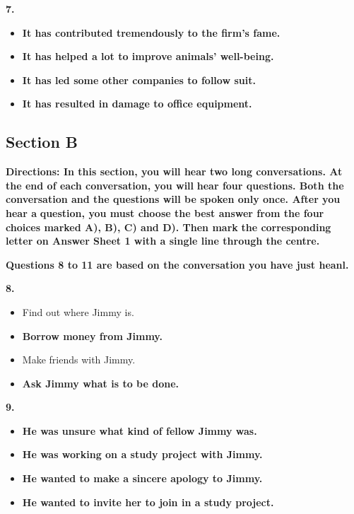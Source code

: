 \documentclass[UTF8,11pt]{ctexart}
\begin{document}
\textbf{7.}


\begin{itemize}[leftmargin=2em,itemsep=.2em,topsep=.4em]\item[A.] \textbf{It has contributed tremendously to the firm's fame.}
\item[B.] \textbf{It has helped a lot to improve animals' well-being.}
\item[C.] \textbf{It has led some other companies to follow suit.}
\item[D.] \textbf{It has resulted in damage to office equipment.}
\end{itemize}

\subsection*{\textbf{Section B}}


\textbf{Directions: In this section, you will hear two long conversations. At the end of each conversation, you will} \textbf{hear four questions. Both the conversation and the questions will be spoken only once. After you hear a} \textbf{question, you must choose the best answer from the four choices marked A), B), C) and D). Then mark} \textbf{the corresponding letter on Answer Sheet 1 with a single line through the centre.}


\textbf{Questions 8 to 11 are based on the conversation you have just heanl.}


\textbf{8.}


\begin{itemize}[leftmargin=2em,itemsep=.2em,topsep=.4em]\item[A.] Find out where Jimmy is.
\item[B.] \textbf{Borrow money from Jimmy.}
\item[C.] Make friends with Jimmy.
\item[D.] \textbf{Ask Jimmy what is to be done.}
\end{itemize}

\textbf{9.}


\begin{itemize}[leftmargin=2em,itemsep=.2em,topsep=.4em]\item[A.] \textbf{He was unsure what kind of fellow Jimmy was.}
\item[B.] \textbf{He was working on a study project with Jimmy.}
\item[C.] \textbf{He wanted to make a sincere apology to Jimmy.}
\item[D.] \textbf{He wanted to invite her to join in a study project.}
\end{itemize}
\end{document}
